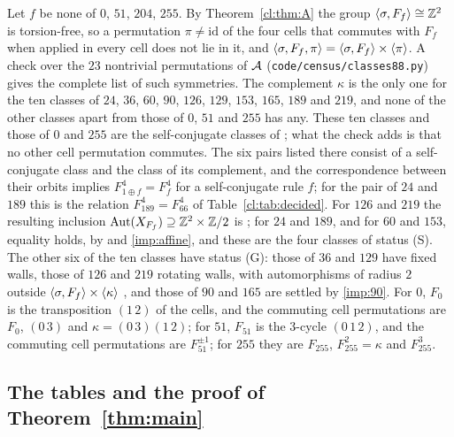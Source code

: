 \begin{remark}\label{cl:rem:kappa}
Let $f$ be none of $0$, $51$, $204$, $255$. By Theorem~\ref{cl:thm:A} the group $\langle\sigma,F_f\rangle\cong\mathbb{Z}^2$ is torsion-free, so a permutation $\pi\ne\mathrm{id}$ of the four cells that commutes with $F_f$ when applied in every cell does not lie in it, and $\langle\sigma,F_f,\pi\rangle=\langle\sigma,F_f\rangle\times\langle\pi\rangle$. A check over the $23$ nontrivial permutations of $\mathcal{A}$ (\texttt{code/census/classes88.py}) gives the complete list of such symmetries. The complement $\kappa$ is the only one for the ten classes of $24$, $36$, $60$, $90$, $126$, $129$, $153$, $165$, $189$ and $219$, and none of the other classes apart from those of $0$, $51$ and $255$ has any. These ten classes and those of $0$ and $255$ are the self-conjugate classes of \cite[(A.4)]{Takesue1989}; what the check adds is that no other cell permutation commutes. The six pairs listed there consist of a self-conjugate class and the class of its complement, and the correspondence between their orbits \cite[(A.1)--(A.3)]{Takesue1989} implies $F_{1\oplus f}^4=F_f^4$ for a self-conjugate rule $f$; for the pair of $24$ and $189$ this is the relation $F_{189}^4=F_{66}^4$ of Table~\ref{cl:tab:decided}. For $126$ and $219$ the resulting inclusion $\operatorname{Aut}(X_{F_f})\supseteq\mathbb{Z}^2\times\mathbb{Z}/2$ is \cite[Proposition~2.5]{PaperC}; for $24$ and $189$, and for $60$ and $153$, equality holds, by \cite[Theorem~1.1(b)]{PaperA} and \eqref{imp:affine}, and these are the four classes of status (S). The other six of the ten classes have status (G): those of $36$ and $129$ have fixed walls, those of $126$ and $219$ rotating walls, with automorphisms of radius $2$ outside $\langle\sigma,F_f\rangle\times\langle\kappa\rangle$ \cite{PaperC}, and those of $90$ and $165$ are settled by \eqref{imp:90}. For $0$, $F_0$ is the transposition $(1\,2)$ of the cells, and the commuting cell permutations are $F_0$, $(0\,3)$ and $\kappa=(0\,3)(1\,2)$; for $51$, $F_{51}$ is the $3$-cycle $(0\,1\,2)$, and the commuting cell permutations are $F_{51}^{\pm1}$; for $255$ they are $F_{255}$, $F_{255}^2=\kappa$ and $F_{255}^3$.
\end{remark}

\subsection{The tables and the proof of Theorem~\ref{thm:main}}\label{cl:sec:main}

